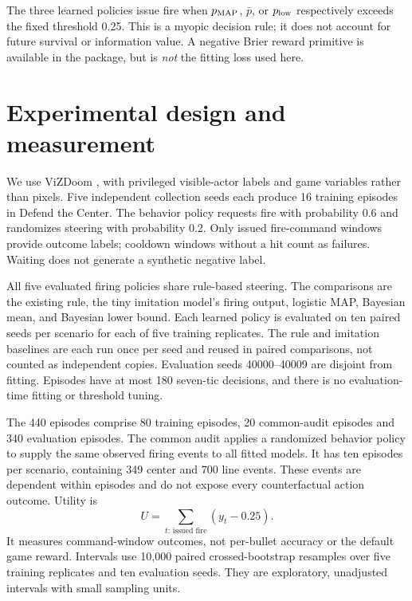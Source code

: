 \documentclass[11pt]{article}
\begin{document}
The three learned policies issue fire when $p_{\rm MAP}$, $\bar p$, or $p_{\rm low}$ respectively exceeds the fixed threshold 0.25. This is a myopic decision rule; it does not account for future survival or information value. A negative Brier reward primitive is available in the package, but is \emph{not} the fitting loss used here.

\section{Experimental design and measurement}
We use ViZDoom \citep{kempka2016vizdoom}, with privileged visible-actor labels and game variables rather than pixels. Five independent collection seeds each produce 16 training episodes in Defend the Center. The behavior policy requests fire with probability 0.6 and randomizes steering with probability 0.2. Only issued fire-command windows provide outcome labels; cooldown windows without a hit count as failures. Waiting does not generate a synthetic negative label.

All five evaluated firing policies share rule-based steering. The comparisons are the existing rule, the tiny imitation model's firing output, logistic MAP, Bayesian mean, and Bayesian lower bound. Each learned policy is evaluated on ten paired seeds per scenario for each of five training replicates. The rule and imitation baselines are each run once per seed and reused in paired comparisons, not counted as independent copies. Evaluation seeds 40000--40009 are disjoint from fitting. Episodes have at most 180 seven-tic decisions, and there is no evaluation-time fitting or threshold tuning.

The 440 episodes comprise 80 training episodes, 20 common-audit episodes and 340 evaluation episodes. The common audit applies a randomized behavior policy to supply the same observed firing events to all fitted models. It has ten episodes per scenario, containing 349 center and 700 line events. These events are dependent within episodes and do not expose every counterfactual action outcome. Utility is
\begin{equation}
 U=\sum_{t:\,\text{issued fire}}(y_t-0.25).
\end{equation}
It measures command-window outcomes, not per-bullet accuracy or the default game reward. Intervals use 10,000 paired crossed-bootstrap resamples over five training replicates and ten evaluation seeds. They are exploratory, unadjusted intervals with small sampling units.
\end{document}
